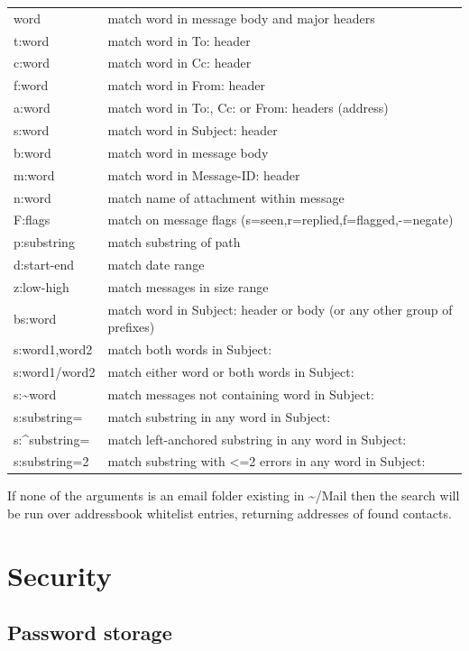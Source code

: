 \documentclass[a4,onecolumn,portrait]{article}
\begin{document}
\begin{center}
\begin{tabular}{ll}
word & match word in message body and major headers\\
t:word & match word in To: header\\
c:word & match word in Cc: header\\
f:word & match word in From: header\\
a:word & match word in To:, Cc: or From: headers (address)\\
s:word & match word in Subject: header\\
b:word & match word in message body\\
m:word & match word in Message-ID: header\\
n:word & match name of attachment within message\\
F:flags & match on message flags (s=seen,r=replied,f=flagged,-=negate)\\
p:substring & match substring of path\\
d:start-end & match date range\\
z:low-high & match messages in size range\\
bs:word & match word in Subject: header or body (or any other group of prefixes)\\
s:word1,word2 & match both words in Subject:\\
s:word1/word2 & match either word or both words in Subject:\\
s:\textasciitilde{}word & match messages not containing word in Subject:\\
s:substring= & match substring in any word in Subject:\\
s:\^{}substring= & match left-anchored substring in any word in Subject:\\
s:substring=2 & match substring with <=2 errors in any word in Subject:\\
\end{tabular}
\end{center}

If none of the arguments is an email folder existing in \textasciitilde{}/Mail then
the search will be run over addressbook whitelist entries, returning
addresses of found contacts.

\section{Security}
\label{sec-8}

\subsection{Password storage}
\label{sec-8-1}
\end{document}
